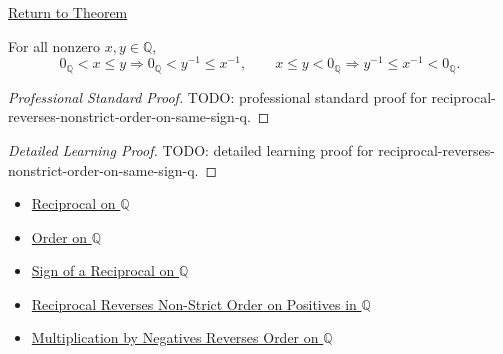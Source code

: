 \newpage
{}
\label{prf:reciprocal-reverses-nonstrict-order-on-same-sign-q}

\begin{remark*}[Return]
\hyperref[thm:reciprocal-reverses-nonstrict-order-on-same-sign-q]{Return to Theorem}
\end{remark*}

\begin{theorem*}
For all nonzero $x,y\in\mathbb{Q}$,
\[
0_{\mathbb{Q}}<x\le y
\Longrightarrow
0_{\mathbb{Q}}<y^{-1}\le x^{-1},
\qquad
x\le y<0_{\mathbb{Q}}
\Longrightarrow
y^{-1}\le x^{-1}<0_{\mathbb{Q}}.
\]
\end{theorem*}

\begin{proof}[Professional Standard Proof]
\LRAProofBodyStart
TODO: professional standard proof for reciprocal-reverses-nonstrict-order-on-same-sign-q.
\end{proof}

\begin{proof}[Detailed Learning Proof]
\LRAProofBodyStart
TODO: detailed learning proof for reciprocal-reverses-nonstrict-order-on-same-sign-q.
\end{proof}

\begin{remark*}
\end{remark*}

\begin{dependencies}
\begin{itemize}
  \item \hyperref[def:reciprocal-on-q-classes]{Reciprocal on $\mathbb{Q}$}
  \item \hyperref[def:order-on-q]{Order on $\mathbb{Q}$}
  \item \hyperref[thm:sign-of-reciprocal-q]{Sign of a Reciprocal on $\mathbb{Q}$}
  \item \hyperref[thm:reciprocal-reverses-nonstrict-order-on-positives-q]{Reciprocal Reverses Non-Strict Order on Positives in $\mathbb{Q}$}
  \item \hyperref[cor:negative-multiplication-reverses-order-on-q]{Multiplication by Negatives Reverses Order on $\mathbb{Q}$}
\end{itemize}
\end{dependencies}

\clearpage
